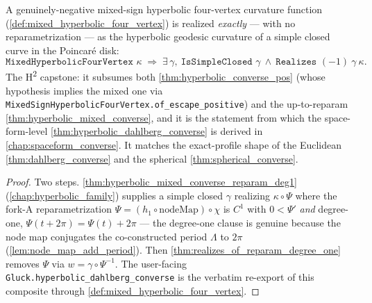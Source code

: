 \begin{theorem}
  \label{thm:hyperbolic_mixed_converse_exact}
  A genuinely-negative mixed-sign hyperbolic four-vertex curvature function
  (\cref{def:mixed_hyperbolic_four_vertex}) is realized \emph{exactly} — with
  no reparametrization — as the hyperbolic geodesic curvature of a simple
  closed curve in the Poincar\'e disk:
  \[
    \texttt{MixedHyperbolicFourVertex }\kappa\;\Longrightarrow\;
    \exists\,\gamma,\ \texttt{IsSimpleClosed }\gamma\ \wedge\
    \texttt{Realizes }(-1)\ \gamma\ \kappa .
  \]
  The H\textsuperscript{2} capstone: it subsumes both
  \cref{thm:hyperbolic_converse_pos} (whose hypothesis implies the mixed one
  via \texttt{MixedSignHyperbolicFourVertex.of\_escape\_positive}) and the
  up-to-reparam \cref{thm:hyperbolic_mixed_converse}, and it is the statement
  from which the space-form-level \cref{thm:hyperbolic_dahlberg_converse} is
  derived in \cref{chap:spaceform_converse}. It matches the exact-profile
  shape of the Euclidean \cref{thm:dahlberg_converse} and the spherical
  \cref{thm:spherical_converse}.
\end{theorem}

\begin{proof}
  \leanok
  Two steps. \cref{thm:hyperbolic_mixed_converse_reparam_deg1}
  (\cref{chap:hyperbolic_family}) supplies a simple closed $\gamma$ realizing
  $\kappa\circ\Psi$ where the fork-A reparametrization
  $\Psi=(h_1\circ\mathrm{nodeMap})\circ\chi$ is $C^1$ with $0<\Psi'$ \emph{and}
  degree-one, $\Psi(t+2\pi)=\Psi(t)+2\pi$ — the degree-one clause is genuine
  because the node map conjugates the co-constructed period $\Lambda$ to
  $2\pi$ (\cref{lem:node_map_add_period}). Then
  \cref{thm:realizes_of_reparam_degree_one} removes $\Psi$ via
  $w=\gamma\circ\Psi^{-1}$. The user-facing \texttt{Gluck.hyperbolic\_dahlberg\_converse}
  is the verbatim re-export of this composite through
  \cref{def:mixed_hyperbolic_four_vertex}.
\end{proof}
